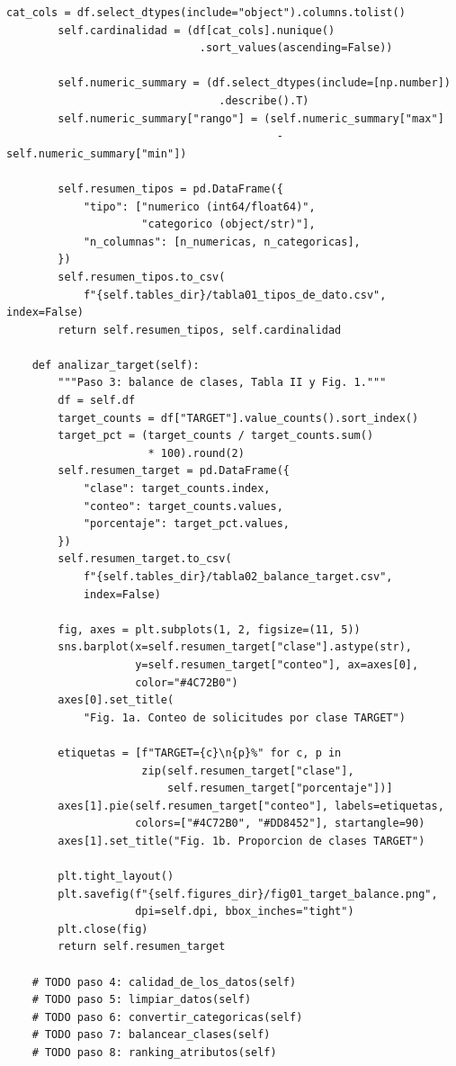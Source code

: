 \documentclass[conference]{IEEEtran}
\begin{document}
\begin{strip}
\begin{lstlisting}[caption={Clase \texttt{HomeCreditAnalysis} -- un método por paso del procedimiento}, label={lst:analysis}]
        cat_cols = df.select_dtypes(include="object").columns.tolist()
        self.cardinalidad = (df[cat_cols].nunique()
                              .sort_values(ascending=False))

        self.numeric_summary = (df.select_dtypes(include=[np.number])
                                 .describe().T)
        self.numeric_summary["rango"] = (self.numeric_summary["max"]
                                          - self.numeric_summary["min"])

        self.resumen_tipos = pd.DataFrame({
            "tipo": ["numerico (int64/float64)",
                     "categorico (object/str)"],
            "n_columnas": [n_numericas, n_categoricas],
        })
        self.resumen_tipos.to_csv(
            f"{self.tables_dir}/tabla01_tipos_de_dato.csv", index=False)
        return self.resumen_tipos, self.cardinalidad

    def analizar_target(self):
        """Paso 3: balance de clases, Tabla II y Fig. 1."""
        df = self.df
        target_counts = df["TARGET"].value_counts().sort_index()
        target_pct = (target_counts / target_counts.sum()
                      * 100).round(2)
        self.resumen_target = pd.DataFrame({
            "clase": target_counts.index,
            "conteo": target_counts.values,
            "porcentaje": target_pct.values,
        })
        self.resumen_target.to_csv(
            f"{self.tables_dir}/tabla02_balance_target.csv",
            index=False)

        fig, axes = plt.subplots(1, 2, figsize=(11, 5))
        sns.barplot(x=self.resumen_target["clase"].astype(str),
                    y=self.resumen_target["conteo"], ax=axes[0],
                    color="#4C72B0")
        axes[0].set_title(
            "Fig. 1a. Conteo de solicitudes por clase TARGET")

        etiquetas = [f"TARGET={c}\n{p}%" for c, p in
                     zip(self.resumen_target["clase"],
                         self.resumen_target["porcentaje"])]
        axes[1].pie(self.resumen_target["conteo"], labels=etiquetas,
                    colors=["#4C72B0", "#DD8452"], startangle=90)
        axes[1].set_title("Fig. 1b. Proporcion de clases TARGET")

        plt.tight_layout()
        plt.savefig(f"{self.figures_dir}/fig01_target_balance.png",
                    dpi=self.dpi, bbox_inches="tight")
        plt.close(fig)
        return self.resumen_target

    # TODO paso 4: calidad_de_los_datos(self)
    # TODO paso 5: limpiar_datos(self)
    # TODO paso 6: convertir_categoricas(self)
    # TODO paso 7: balancear_clases(self)
    # TODO paso 8: ranking_atributos(self)
\end{lstlisting}


\end{strip}
\end{document}
